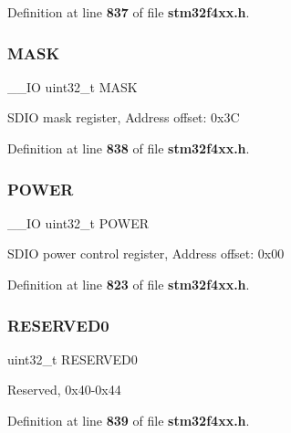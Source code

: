 Definition at line \textbf{ 837} of file \textbf{ stm32f4xx.\+h}.

\mbox{\label{structSDIO__TypeDef_a5c955643593b4aedbe9f84f054d26522}} 
\subsubsection{M\+A\+SK}
{\footnotesize\ttfamily \+\_\+\+\_\+\+IO uint32\+\_\+t M\+A\+SK}

S\+D\+IO mask register, Address offset\+: 0x3C 

Definition at line \textbf{ 838} of file \textbf{ stm32f4xx.\+h}.

\mbox{\label{structSDIO__TypeDef_a65bff76f3af24c37708a1006d54720c7}} 
\subsubsection{P\+O\+W\+ER}
{\footnotesize\ttfamily \+\_\+\+\_\+\+IO uint32\+\_\+t P\+O\+W\+ER}

S\+D\+IO power control register, Address offset\+: 0x00 

Definition at line \textbf{ 823} of file \textbf{ stm32f4xx.\+h}.

\mbox{\label{structSDIO__TypeDef_af2c92c7cb13569aaff6b4f5a25de5056}} 
\subsubsection{R\+E\+S\+E\+R\+V\+E\+D0}
{\footnotesize\ttfamily uint32\+\_\+t R\+E\+S\+E\+R\+V\+E\+D0}

Reserved, 0x40-\/0x44 

Definition at line \textbf{ 839} of file \textbf{ stm32f4xx.\+h}.

\mbox{\label{structSDIO__TypeDef_a7de5924e16c39a869739dbb174f62fce}} 
